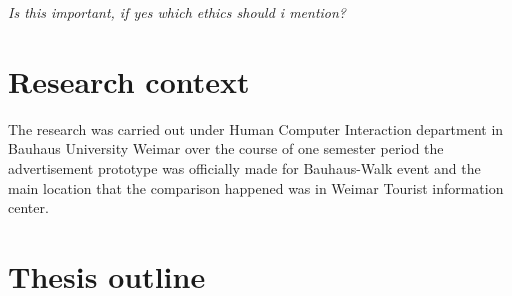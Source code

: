 \emph{Is this important, if yes which ethics should i mention?}


\section{Research context}
The research was carried out under Human Computer Interaction department in Bauhaus University Weimar over the course of one semester period the advertisement prototype was officially made for Bauhaus-Walk event and the main location that the comparison happened was in Weimar Tourist information center.



\section{Thesis outline}
